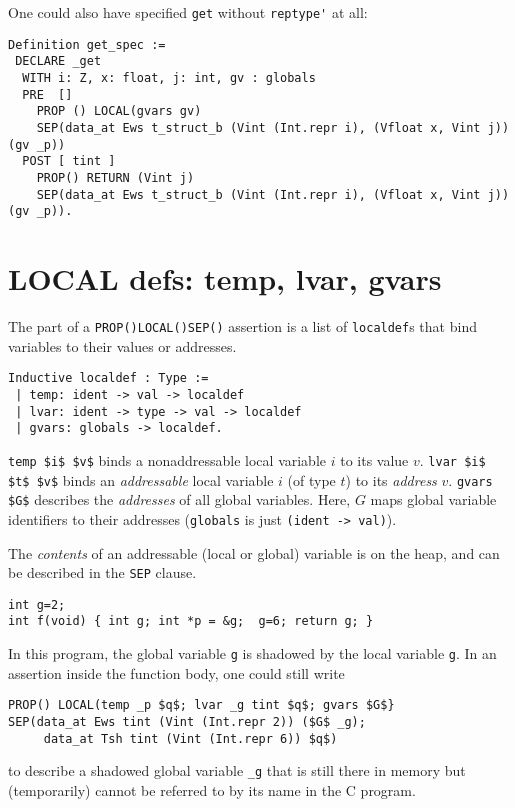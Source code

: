 \documentclass[12pt,fleqn,openany,oneside,showtrims]{memoir}
\begin{document}
One could also have specified \lstinline{get} without \lstinline{reptype'} at all:
\begin{lstlisting}
Definition get_spec :=
 DECLARE _get
  WITH i: Z, x: float, j: int, gv : globals
  PRE  []
    PROP () LOCAL(gvars gv)
    SEP(data_at Ews t_struct_b (Vint (Int.repr i), (Vfloat x, Vint j)) (gv _p))
  POST [ tint ]
    PROP() RETURN (Vint j)
    SEP(data_at Ews t_struct_b (Vint (Int.repr i), (Vfloat x, Vint j)) (gv _p)).
\end{lstlisting}

\chapter{{\upshape LOCAL} defs: \upshape \sffamily temp, lvar, gvars}
\label{refcard:localdefs}
\label{refcard:gvar}

The \LOCAL{} part of a \lstinline{PROP()LOCAL()SEP()} assertion
is a list of \lstinline{localdef}s that
bind variables to their values or addresses.

\begin{lstlisting}
Inductive localdef : Type :=
 | temp: ident -> val -> localdef
 | lvar: ident -> type -> val -> localdef
 | gvars: globals -> localdef.
\end{lstlisting}
\lstinline{temp $i$ $v$} binds a nonaddressable local
variable $i$ to its value $v$.\newline
\lstinline{lvar $i$ $t$ $v$} binds an \emph{addressable} local
variable $i$ (of type $t$) to its \emph{address} $v$.\newline
\lstinline{gvars $G$} describes the \emph{addresses} of all global variables.
Here, $G$ maps global variable identifiers to their addresses (\lstinline{globals} is just \lstinline{(ident -> val)}).

The \emph{contents} of an addressable (local or global) variable
is on the heap, and can be described in the \lstinline{SEP} clause.

\begin{lstlisting}
int g=2;
int f(void) { int g; int *p = &g;  g=6; return g; }
\end{lstlisting}
In this program, the global variable \lstinline{g}
is shadowed by the local variable \lstinline{g}.
In an assertion inside the
function body, one could still write
\begin{lstlisting}
PROP() LOCAL(temp _p $q$; lvar _g tint $q$; gvars $G$}
SEP(data_at Ews tint (Vint (Int.repr 2)) ($G$ _g);
     data_at Tsh tint (Vint (Int.repr 6)) $q$)
\end{lstlisting}
to describe a shadowed global variable \lstinline{_g} that
is still there in memory but (temporarily) cannot be referred
to by its name in the C program.
\end{document}
